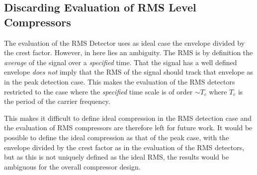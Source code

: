 \documentclass[../main2.tex]{subfiles}
\begin{document}
\subsection{Discarding Evaluation of RMS Level Compressors}\label{method_rms_compressors}
The evaluation of the RMS Detector uses as ideal case the envelope divided by the crest factor. However, in here lies an ambiguity. The RMS is by definition the \emph{average} of the signal over a \emph{specified} time. That the signal has a well defined envelope \emph{does not} imply that the RMS of the signal should track that envelope as in the peak detection case. This makes the evaluation of the RMS detectors restricted to the case where the \emph{specified} time scale is of order $\sim T_c$ where $T_c$ is the period of the carrier frequency.

This makes it difficult to define ideal compression in the RMS detection case and the evaluation of RMS compressors are therefore left for future work. It would be possible to define the ideal compression as that of the peak case, with the envelope divided by the crest factor as in the evaluation of the RMS detectors, but as this is not uniquely defined as the ideal RMS, the results would be ambiguous for the overall compressor design.
\end{document}
